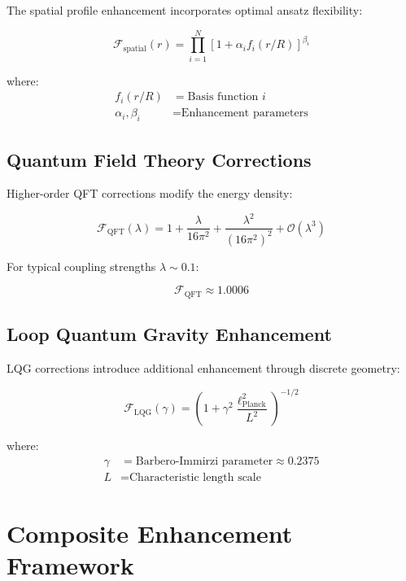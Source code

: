 \documentclass[12pt,a4paper]{article}
\begin{document}
The spatial profile enhancement incorporates optimal ansatz flexibility:

\begin{equation}
\mathcal{F}_{\text{spatial}}(r) = \prod_{i=1}^{N} \left[1 + \alpha_i f_i(r/R)\right]^{\beta_i}
\end{equation}

where:
\begin{align}
f_i(r/R) &= \text{Basis function } i \\
\alpha_i, \beta_i &= \text{Enhancement parameters}
\end{align}

\subsection{Quantum Field Theory Corrections}

Higher-order QFT corrections modify the energy density:

\begin{equation}
\mathcal{F}_{\text{QFT}}(\lambda) = 1 + \frac{\lambda}{16\pi^2} + \frac{\lambda^2}{(16\pi^2)^2} + \mathcal{O}(\lambda^3)
\end{equation}

For typical coupling strengths $\lambda \sim 0.1$:

\begin{equation}
\mathcal{F}_{\text{QFT}} \approx 1.0006
\end{equation}

\subsection{Loop Quantum Gravity Enhancement}

LQG corrections introduce additional enhancement through discrete geometry:

\begin{equation}
\mathcal{F}_{\text{LQG}}(\gamma) = \left(1 + \gamma^2 \frac{\ell_{\text{Planck}}^2}{L^2}\right)^{-1/2}
\end{equation}

where:
\begin{align}
\gamma &= \text{Barbero-Immirzi parameter} \approx 0.2375 \\
L &= \text{Characteristic length scale}
\end{align}

\section{Composite Enhancement Framework}
\end{document}
